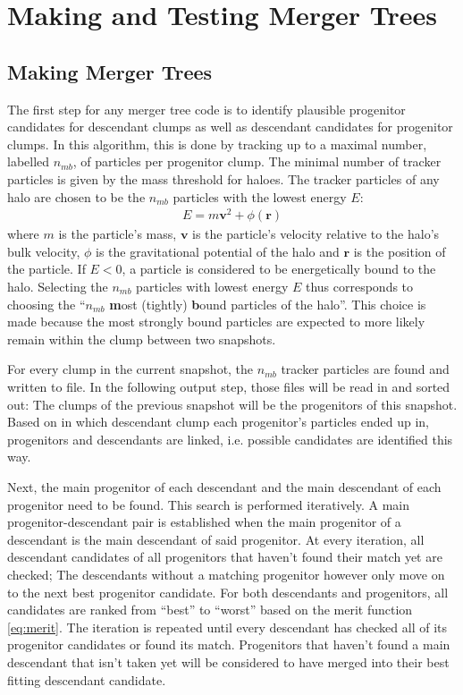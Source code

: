 \section{Making and Testing Merger Trees}\label{chap:my_code}

\subsection{Making Merger Trees}


The first step for any merger tree code is to identify plausible progenitor candidates for descendant clumps as well as descendant candidates for progenitor clumps.
In this algorithm, this is done by tracking up to a maximal number, labelled $n_{mb}$, of particles per progenitor clump.
The minimal number of tracker particles is given by the mass threshold for haloes.
The tracker particles of any halo are chosen to be the $n_{mb}$ particles with the lowest energy $E$:
\begin{align*}
	E = m \mathbf{v} ^2 + \phi(\mathbf{r})
\end{align*}
where $m$ is the particle's mass, $\mathbf{v}$ is the particle's velocity relative to the halo's bulk velocity, $\phi$ is the gravitational potential of the halo and $\mathbf{r}$ is the position of the particle.
If $E < 0$, a particle is considered to be energetically bound to the halo. 
Selecting the $n_{mb}$ particles with lowest energy $E$ thus corresponds to choosing the ``$n_{mb}$ \textbf{m}ost (tightly) \textbf{b}ound particles of the halo''.
This choice is made because the most strongly bound particles are expected to more likely remain within the clump between two snapshots.


For every clump in the current snapshot, the $n_{mb}$ tracker particles are found and written to file.
In the following output step, those files will be read in and sorted out: 
The clumps of the previous snapshot will be the progenitors of this snapshot. 
Based on in which descendant clump each progenitor's particles ended up in, progenitors and descendants are linked, i.e. possible candidates are identified this way.
 
Next, the main progenitor of each descendant and the main descendant of each progenitor need to be found. 
This search is performed iteratively.
A main progenitor-descendant pair is established when the main progenitor of a descendant is the main descendant of said progenitor. 
At every iteration, all descendant candidates of all progenitors that haven't found their match yet are checked;
The descendants without a matching progenitor however only move on to the next best progenitor candidate. 
For both descendants and progenitors, all candidates are ranked from ``best'' to ``worst'' based on the merit function \eqref{eq:merit}.
The iteration is repeated until every descendant has checked all of its progenitor candidates or found its match. 
Progenitors that haven't found a main descendant that isn't taken yet will be considered to have merged into their best fitting descendant candidate.


